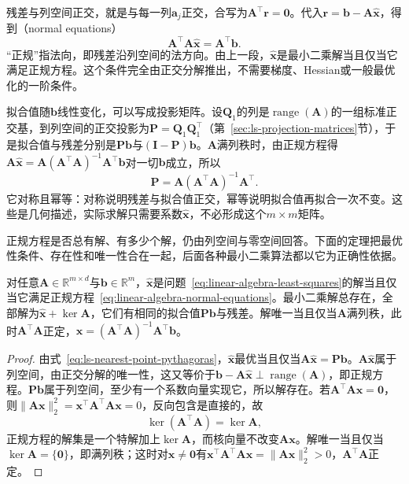 残差与列空间正交，就是与每一列$\bm a_j$正交，合写为$\bm A^\top\bm r=\bm0$。代入$\bm r=\bm b-\bm A\hat{\bm x}$，得到（normal equations）
\begin{equation}
 \bm A^\top\bm A\hat{\bm x}=\bm A^\top\bm b .
 \label{eq:linear-algebra-normal-equations}
\end{equation}
“正规”指法向，即残差沿列空间的法方向。由上一段，$\hat{\bm x}$是最小二乘解当且仅当它满足正规方程。这个条件完全由正交分解推出，不需要梯度、Hessian或一般最优化的一阶条件。

拟合值随$\bm b$线性变化，可以写成投影矩阵。设$\bm Q_1$的列是$\operatorname{range}(\bm A)$的一组标准正交基，到列空间的正交投影为$\bm P=\bm Q_1\bm Q_1^\top$（第~\ref{sec:ls-projection-matrices}节），于是拟合值与残差分别是$\bm P\bm b$与$(\bm I-\bm P)\bm b$。$\bm A$满列秩时，由正规方程得$\bm A\hat{\bm x}=\bm A(\bm A^\top\bm A)^{-1}\bm A^\top\bm b$对一切$\bm b$成立，所以
\begin{equation}
 \bm P=\bm A(\bm A^\top\bm A)^{-1}\bm A^\top .
 \label{eq:ls-column-space-projector}
\end{equation}
它对称且幂等：对称说明残差与拟合值正交，幂等说明拟合值再拟合一次不变。这些是几何描述，实际求解只需要系数$\hat{\bm x}$，不必形成这个$m\times m$矩阵。

正规方程是否总有解、有多少个解，仍由列空间与零空间回答。下面的定理把最优性条件、存在性和唯一性合在一起，后面各种最小二乘算法都以它为正确性依据。

\begin{theorem}[最小二乘解的刻画]
\label{thm:ls-least-squares-solutions}
对任意$\bm A\in\mathbb R^{m\times d}$与$\bm b\in\mathbb R^m$，$\hat{\bm x}$是问题~\eqref{eq:linear-algebra-least-squares}的解当且仅当它满足正规方程~\eqref{eq:linear-algebra-normal-equations}。最小二乘解总存在，全部解为$\hat{\bm x}+\ker\bm A$，它们有相同的拟合值$\bm P\bm b$与残差。解唯一当且仅当$\bm A$满列秩，此时$\bm A^\top\bm A$正定，$\hat{\bm x}=(\bm A^\top\bm A)^{-1}\bm A^\top\bm b$。
\end{theorem}
\begin{proof}
由式~\eqref{eq:ls-nearest-point-pythagoras}，$\hat{\bm x}$最优当且仅当$\bm A\hat{\bm x}=\bm P\bm b$。$\bm A\hat{\bm x}$属于列空间，由正交分解的唯一性，这又等价于$\bm b-\bm A\hat{\bm x}\perp\operatorname{range}(\bm A)$，即正规方程。$\bm P\bm b$属于列空间，至少有一个系数向量实现它，所以解存在。若$\bm A^\top\bm A\bm x=\bm0$，则$\lVert\bm A\bm x\rVert_2^2=\bm x^\top\bm A^\top\bm A\bm x=0$，反向包含是直接的，故
\begin{equation}
 \ker(\bm A^\top\bm A)=\ker\bm A ,
 \label{eq:ls-normal-kernel}
\end{equation}
正规方程的解集是一个特解加上$\ker\bm A$，而核向量不改变$\bm A\bm x$。解唯一当且仅当$\ker\bm A=\{\bm0\}$，即满列秩；这时对$\bm x\neq\bm0$有$\bm x^\top\bm A^\top\bm A\bm x=\lVert\bm A\bm x\rVert_2^2>0$，$\bm A^\top\bm A$正定。
\end{proof}

